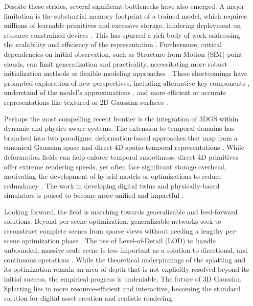 \documentclass[11pt,a4paper]{article}
\begin{document}
Despite these strides, several significant bottlenecks have also emerged. A major limitation is the substantial memory footprint of a trained model, which requires millions of learnable primitives and excessive storage, hindering deployment on resource-constrained devices \cite{arxiv:2406.17074v1,arxiv:2401.03890v2}. This has spurred a rich body of work addressing the scalability and efficiency of the representation \cite{arxiv:2502.19457v1,arxiv:2408.03822v1,arxiv:2512.07197v1}. Furthermore, critical dependencies on initial observation, such as Structure-from-Motion (SfM) point clouds, can limit generalization and practicality, necessitating more robust initialization methods or flexible modeling approaches \cite{arxiv:2409.11307v1,arxiv:2604.07053v2}. These shortcomings have prompted exploration of new perspectives, including alternative key components \cite{arxiv:2403.14244v1}, understand of the model's approximations \cite{arxiv:2502.19318v1}, and more efficient or accurate representations like textured or 2D Gaussian surfaces \cite{arxiv:2409.12954v1,arxiv:2412.12734v1,arxiv:2403.17888v1}.

Perhaps the most compelling recent frontier is the integration of 3DGS within dynamic and physics-aware systems. The extension to temporal domains has branched into two paradigms: deformation-based approaches that map from a canonical Gaussian space \cite{arxiv:2603.20857v1,arxiv:2311.12897v1} and direct 4D spatio-temporal representations \cite{arxiv:2412.20720v2,arxiv:2310.10642v3}. While deformation fields can help enforce temporal smoothness, direct 4D primitives offer extreme rendering speeds, yet often face significant storage overhead, motivating the development of hybrid models or optimizations to reduce redundancy \cite{arxiv:2505.13215v1,arxiv:2505.08196v1}. The work in developing digital twins and physically-based simulators is poised to become more unified and impactful \cite{arxiv:2510.26694v1}.

Looking forward, the field is marching towards generalizable and feed-forward solutions. Beyond per-scene optimization, generalizable networks seek to reconstruct complete scenes from sparse views without needing a lengthy per-scene optimization phase \cite{arxiv:2604.07053v2,arxiv:2409.11307v1}. The use of Level-of-Detail (LOD) to handle unbounded, massive-scale scene is less important as a solution to directional, and continuous operations \cite{arxiv:2403.17898v1}. While the theoretical underpinnings of the splatting and its optimization remain an area of depth that is not explicitly resolved beyond its initial success, the empirical progress is undeniable. The future of 3D Gaussian Splatting lies in more resource-efficient and interactive, becoming the standard solution for digital asset creation and realistic rendering.
\end{document}
